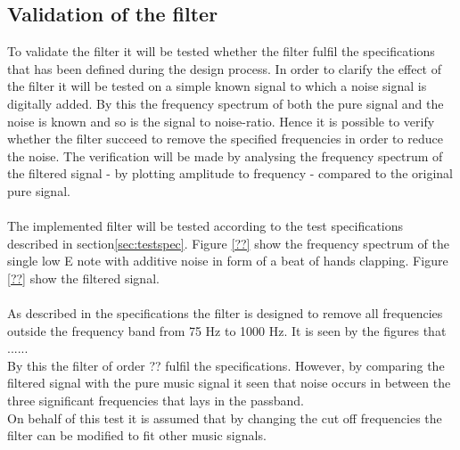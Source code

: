 \subsection{Validation of the filter}
To validate the filter it will be tested whether the filter fulfil the specifications that has been defined during the design process. In order to clarify the effect of the filter it will be tested on a simple known signal to which a noise signal is digitally added. By this the frequency spectrum of both the pure signal and the noise is known and so is the signal to noise-ratio. Hence it is possible to verify whether the filter succeed to remove the specified frequencies in order to reduce the noise. The verification will be made by analysing the frequency spectrum of the filtered signal - by plotting amplitude to frequency - compared to the original pure signal. \\ \\
The implemented filter will be tested according to the test specifications described in section\ref{sec:testspec}. Figure \ref{??}  show the frequency spectrum of the single low E note with additive noise in form of a beat of hands clapping. Figure \ref{??} show the filtered signal.
\\ \\
As described in the specifications the filter is designed to remove all frequencies outside the frequency band from 75 Hz to 1000 Hz. It is seen by the figures that ...... \\
By this the filter of order ?? fulfil the specifications. However, by comparing the filtered signal with the pure music signal it seen that noise occurs in between the three significant frequencies that lays in the passband.  \\
On behalf of this test it is assumed that by changing the cut off frequencies the filter can be modified to fit other music signals.  